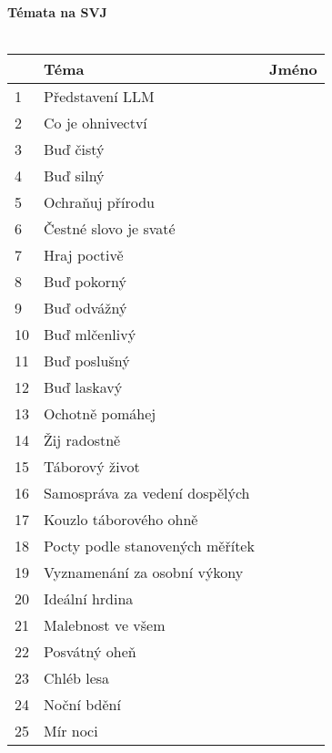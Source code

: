\documentclass[12pt, a4paper, landscape]{article}
\begin{document}
	\begin{multicols}{2}
		
		\textbf{\huge Témata na SVJ}
		\\
		\\
		\begin{tabular}{ | p{}| p{} | p{}|}
			\hline
			 & Téma &  Jméno \\
			\hline
			\hline
			1 & Představení LLM & \\ \hline
			2 & Co je ohnivectví & \\ \hline
			\hline
			3 & Buď čistý & \\ \hline
			4 & Buď silný  & \\ \hline
			5 & Ochraňuj přírodu  & \\ \hline
			6 & Čestné slovo je svaté  & \\ \hline
			7 & Hraj poctivě  & \\ \hline
			8 & Buď pokorný  & \\ \hline
			9 & Buď odvážný  & \\ \hline
			10 & Buď mlčenlivý  & \\ \hline
			11 & Buď poslušný  & \\ \hline
			12 & Buď laskavý  & \\ \hline
			13 & Ochotně pomáhej  & \\ \hline
			14 & Žij radostně  & \\ \hline
			\hline
			15 & Táborový život  & \\ \hline
			16 & Samospráva za vedení dospělých  & \\ \hline
			17 & Kouzlo táborového ohně  & \\ \hline
			18 & Pocty podle stanovených měřítek  & \\ \hline
			19 & Vyznamenání za osobní výkony  & \\ \hline
			20 & Ideální hrdina  & \\ \hline
			21 & Malebnost ve všem  & \\ \hline
			\hline
			22 & Posvátný oheň & \\ \hline
			23 & Chléb lesa  & \\ \hline
			24 & Noční bdění  & \\ \hline
			25 & Mír noci  & \\ \hline
		\end{tabular}
		

\end{multicols}
\end{document}

